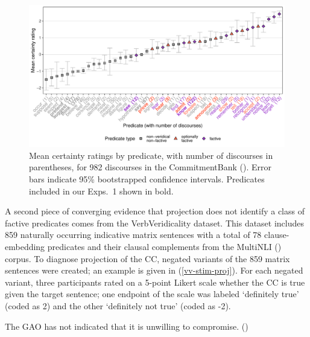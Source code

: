 \documentclass[11pt,fleqn]{article}
\newcommand{\6}{\mbox{$[\hspace*{-.6mm}[$}}
\newcommand{\9}{\mbox{$]\hspace*{-.6mm}]$}}
\begin{document}
\begin{figure}[H]
\centering
\includegraphics[width=.75\paperwidth]{../../CommitmentBank-analysis/graphs/means-projectivity-by-predicate-variability}

\caption{Mean certainty ratings by predicate, with number of discourses in parentheses, for 982 discourses in the CommitmentBank (\citealt*{demarneffe-etal-sub23}). Error bars indicate 95\% bootstrapped confidence intervals. Predicates included in our Exps.~1 shown in bold.}
\label{f-commitmentbank}
\end{figure}

A second piece of converging evidence that projection does not identify a class of factive predicates comes from the VerbVeridicality dataset. This dataset includes 859 naturally occurring indicative matrix sentences with a total of 78 clause-embedding predicates and their clausal complements from the MultiNLI (\citealt{williams-etal2018}) corpus. To diagnose projection of the CC, negated variants of the 859 matrix sentences were created; an example is given in (\ref{vv-stim-proj}). For each negated variant, three participants rated on a 5-point Likert scale whether the CC is true given the target sentence; one endpoint of the scale was labeled `definitely true' (coded as 2) and the other `definitely not true' (coded as -2).

\begin{exe}
\ex\label{vv-stim-proj} The GAO has not indicated that it is unwilling to compromise. \hfill (\citealt[2234]{ross-pavlick2019})
\end{exe}
\end{document}
